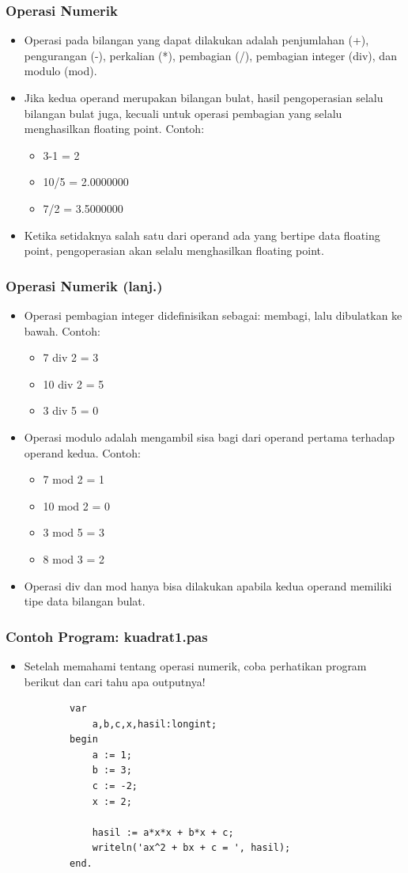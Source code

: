 \documentclass{beamer}
\begin{document}
\begin{frame}
\frametitle{Operasi Numerik}
\begin{itemize}
	\item Operasi pada bilangan yang dapat dilakukan adalah penjumlahan (+), pengurangan (-), perkalian (*), pembagian (/), pembagian integer (div), dan modulo (mod).
	\item Jika kedua operand merupakan bilangan bulat, hasil pengoperasian selalu bilangan bulat juga, kecuali untuk operasi pembagian yang selalu menghasilkan floating point. Contoh:
	\begin{itemize}
		\item 3-1 = 2
		\item 10/5 = 2.0000000
		\item 7/2 = 3.5000000
	\end{itemize}
	\item Ketika setidaknya salah satu dari operand ada yang bertipe data floating point, pengoperasian akan selalu menghasilkan floating point.
\end{itemize}
\end{frame}

\begin{frame}
\frametitle{Operasi Numerik (lanj.)}
\begin{itemize}
	\item Operasi pembagian integer didefinisikan sebagai: membagi, lalu dibulatkan ke bawah. Contoh:
	\begin{itemize}
		\item 7 div 2 = 3
		\item 10 div 2 = 5
		\item 3 div 5 = 0
	\end{itemize}
	\item Operasi modulo adalah mengambil sisa bagi dari operand pertama terhadap operand kedua. Contoh:
	\begin{itemize}
		\item 7 mod 2 = 1
		\item 10 mod 2 = 0
		\item 3 mod 5 = 3
		\item 8 mod 3 = 2
	\end{itemize}
	\item Operasi div dan mod hanya bisa dilakukan apabila kedua operand memiliki tipe data bilangan bulat.
\end{itemize}
\end{frame}

\begin{frame}[fragile]
\frametitle{Contoh Program: kuadrat1.pas}
\begin{itemize}
	\item Setelah memahami tentang operasi numerik, coba perhatikan program berikut dan cari tahu apa outputnya!
	\begin{lstlisting}
		var
		    a,b,c,x,hasil:longint;
		begin
		    a := 1;
		    b := 3;
		    c := -2;
		    x := 2;	    

		    hasil := a*x*x + b*x + c;
		    writeln('ax^2 + bx + c = ', hasil);
		end.
	\end{lstlisting}
\end{itemize}
\end{frame}
\end{document}
